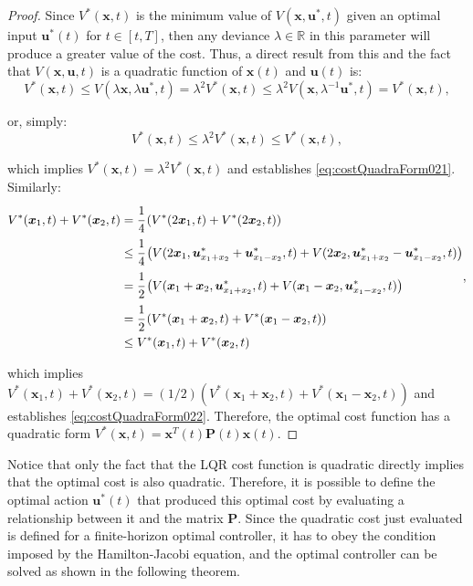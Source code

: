 \documentclass[a4paper,11pt]{book}
\numberwithin{figure}{chapter}
\numberwithin{equation}{chapter}
\numberwithin{table}{chapter}
\theoremstyle{definition}
\begin{document}
\begin{proof}
    Since $V^*(\bm{x}, t)$ is the minimum value of $V(\bm{x}, \bm{u}^*, t)$ given an optimal input $\bm{u}^*(t)$ for $t \in [t, T]$, then any deviance $\lambda \in \mathbb{R}$ in this parameter will produce a greater value of the cost. Thus, a direct result from this and the fact that $V(\bm{x}, \bm{u}, t)$ is a quadratic function of $\bm{x}(t)$ and $\bm{u}(t)$ is:
    \begin{equation}
        V^*(\bm{x}, t) \leq V(\lambda \bm{x}, \lambda \bm{u}^*, t) = \lambda^2 V^*(\bm{x}, t) \leq \lambda^2 V(\bm{x}, \lambda^{-1} \bm{u}^*, t) = V^*(\bm{x}, t)
    ,\end{equation}
    
    \noindent or, simply:
    \begin{equation}
        V^*(\bm{x}, t) \leq \lambda^2 V^*(\bm{x}, t) \leq V^*(\bm{x}, t)
    ,\end{equation}
    
    \noindent which implies $V^*(\bm{x}, t) = \lambda^2 V^*(\bm{x}, t)$ and establishes \eqref{eq:costQuadraForm021}. Similarly:
    \begin{align}
    \begin{split}
        V^*(\bm{x}_1, t) + V^*(\bm{x}_2, t) &= \cfrac{1}{4} \left( V^*(2 \bm{x}_1, t) + V^*(2 \bm{x}_2, t) \right) \\
            & \leq \cfrac{1}{4} \left( V(2 \bm{x}_1, \bm{u}_{x_1+x_2}^* + \bm{u}_{x_1-x_2}^*, t) + V(2 \bm{x}_2, \bm{u}_{x_1+x_2}^* - \bm{u}_{x_1-x_2}^*, t) \right) \\
            & = \cfrac{1}{2} \left( V(\bm{x}_1 + \bm{x}_2, \bm{u}_{x_1+x_2}^*, t) + V(\bm{x}_1 - \bm{x}_2, \bm{u}_{x_1-x_2}^*, t) \right) \\
            & = \cfrac{1}{2} \left( V^*(\bm{x}_1 + \bm{x}_2, t) + V^*(\bm{x}_1 - \bm{x}_2, t) \right) \\
            & \leq V^*(\bm{x}_1, t) + V^*(\bm{x}_2, t)
    \end{split}
    ,\end{align}
    
    \noindent which implies $V^*(\bm{x}_1, t) + V^*(\bm{x}_2, t) = (1/2) \left( V^*(\bm{x}_1 + \bm{x}_2, t) + V^*(\bm{x}_1 - \bm{x}_2, t) \right)$ and establishes \eqref{eq:costQuadraForm022}. Therefore, the optimal cost function has a quadratic form $V^*(\bm{x}, t) = \bm{x}^T(t) \bm{P}(t) \bm{x}(t)$.
\end{proof}

Notice that only the fact that the LQR cost function is quadratic directly implies that the optimal cost is also quadratic. Therefore, it is possible to define the optimal action $\bm{u}^*(t)$ that produced this optimal cost by evaluating a relationship between it and the matrix $\bm{P}$. Since the quadratic cost just evaluated is defined for a finite-horizon optimal controller, it has to obey the condition imposed by the Hamilton-Jacobi equation, and the optimal controller can be solved as shown in the following theorem.
\end{document}
